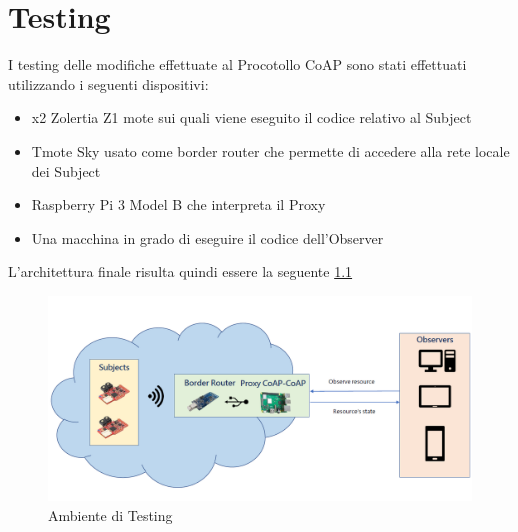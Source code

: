 
\chapter{Testing}
  I testing delle modifiche effettuate al Procotollo CoAP sono stati effettuati utilizzando i seguenti dispositivi:
  \begin{itemize}
    \item x2 Zolertia Z1 mote sui quali viene eseguito il codice relativo al Subject
    \item Tmote Sky usato come border router che permette di accedere alla rete locale dei Subject
    \item Raspberry Pi 3 Model B che interpreta il Proxy
    \item Una macchina in grado di eseguire il codice dell'Observer
  \end{itemize}
  L'architettura finale risulta quindi essere la seguente \ref{fig:architettura}
  \begin{figure}
    \includegraphics[width=\linewidth]{../Immagini/ArchitetturaGenerale.png}
    \caption{Ambiente di Testing}
    \label{fig:architettura}
  \end{figure}
